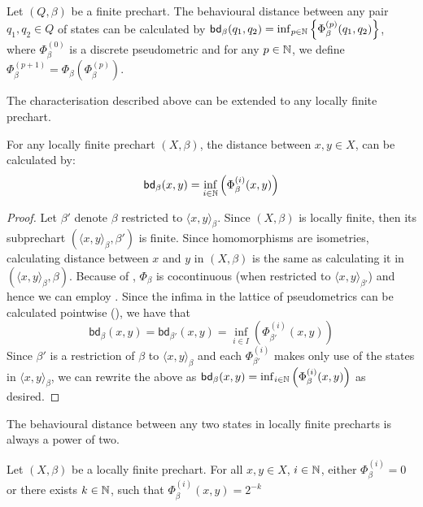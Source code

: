 \begin{lemma}\label{lem:finite_dist}
	Let $(Q, \beta)$ be a finite prechart. The behavioural distance between any pair $q_1, q_2 \in Q$ of states can be calculated by $\mathsf{bd}_\beta(q_1,q_2) = \inf_{p \in \mathbb{N}} \left \{ \Phi^{(p)}_\beta(q_1, q_2) \right\}$, where $\Phi^{(0)}_\beta$ is a discrete pseudometric and for any $p \in \mathbb{N}$, we define $\Phi^{(p+1)}_\beta = \Phi_\beta \left( \Phi^{(p)}_\beta\right)$.
\end{lemma}
The characterisation described above can be extended to any locally finite prechart.
\begin{corollary}\label{cor:kleene_locally_finite}
	For any locally finite prechart $(X,\beta)$, the distance between $x, y \in X$, can be calculated by:
	\[
		\mathsf{bd}_\beta(x,y) = \inf_{i \in \mathbb{N}} \left(\Phi_\beta^{(i)}(x,y)\right)
	\]
\end{corollary}
\begin{proof}
Let $\beta'$ denote $\beta$ restricted to $\langle x , y \rangle_\beta$.
	Since $(X, \beta)$ is locally finite, then its subprechart $(\langle x , y \rangle_\beta, \beta')$ is finite. Since homomorphisms are isometries, calculating distance between $x$ and $y$ in $(X, \beta)$ is the same as calculating it in $(\langle x , y \rangle_\beta, \beta)$. Because of , $\Phi_\beta$ is cocontinuous (when restricted to $\langle x , y \rangle_{\beta'}$) and hence we can employ . Since the infima in the lattice of pseudometrics can be calculated pointwise (), we have that
	$$
	\mathsf{bd}_\beta(x,y) = \mathsf{bd}_{\beta'}(x,y) = \inf_{i \in I} \left( \Phi^{(i)}_{\beta'}(x,y)\right)
	$$
	Since $\beta'$ is a restriction of $\beta$ to ${\langle x , y \rangle_\beta}$ and each $\Phi^{(i)}_{\beta'}$ makes only use of the states in $\langle x , y \rangle_\beta$, we can rewrite the above as $
	\mathsf{bd}_\beta(x,y) = \inf_{i \in \mathbb{N}} \left(\Phi_\beta^{(i)}(x,y)\right)
	$ as desired.
\end{proof} 
The behavioural distance between any two states in locally finite precharts is always a power of two.
\begin{lemma}\label{lem:distance_power_of_two}
	Let $(X,\beta)$ be a locally finite prechart. For all $x,y \in X$, $i \in \mathbb{N}$, either $\Phi_\beta^{(i)}=0$ or there exists $k \in \mathbb{N}$, such that $\Phi_{\beta}^{(i)}(x,y)=2^{-k}$
\end{lemma}
